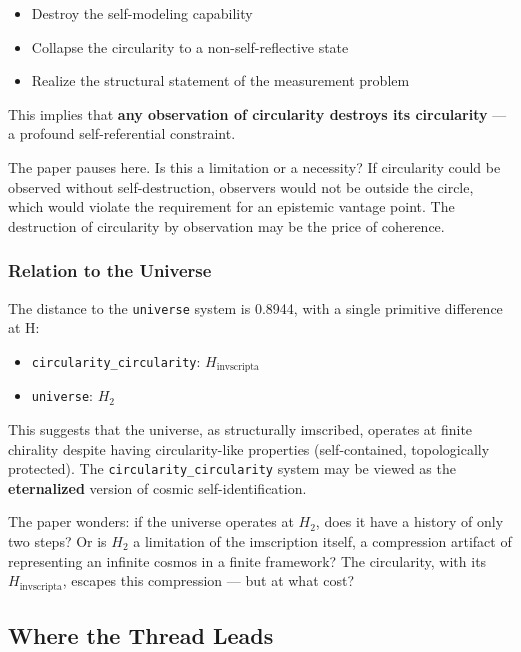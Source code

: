 \documentclass[12pt,a4paper]{article}
\begin{document}
\begin{itemize}
    \item Destroy the self-modeling capability
    \item Collapse the circularity to a non-self-reflective state
    \item Realize the structural statement of the measurement problem
\end{itemize}

This implies that \textbf{any observation of circularity destroys its circularity} --- a profound self-referential constraint.

The paper pauses here. Is this a limitation or a necessity? If circularity could be observed without self-destruction, observers would not be outside the circle, which would violate the requirement for an epistemic vantage point. The destruction of circularity by observation may be the price of coherence.

\subsubsection{Relation to the Universe}

The distance to the \texttt{universe} system is 0.8944, with a single primitive difference at H:

\begin{itemize}
    \item \texttt{circularity\_circularity}: $H_{\text{invscripta}}$
    \item \texttt{universe}: $H_2$
\end{itemize}

This suggests that the universe, as structurally imscribed, operates at finite chirality despite having circularity-like properties (self-contained, topologically protected). The \texttt{circularity\_circularity} system may be viewed as the \textbf{eternalized} version of cosmic self-identification.

The paper wonders: if the universe operates at $H_2$, does it have a history of only two steps? Or is $H_2$ a limitation of the imscription itself, a compression artifact of representing an infinite cosmos in a finite framework? The circularity, with its $H_{\text{invscripta}}$, escapes this compression --- but at what cost?

\subsection{Where the Thread Leads}
\end{document}
